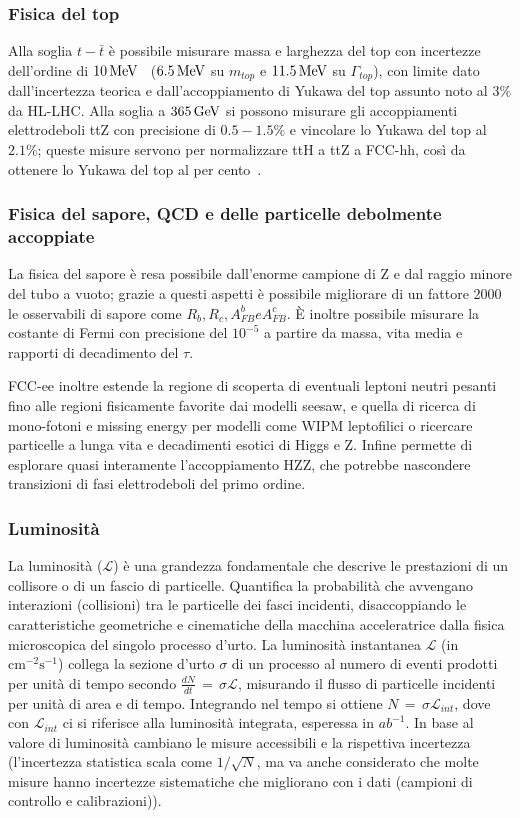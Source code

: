 \subsubsection{Fisica del top}
Alla soglia $t-\bar t$ è possibile misurare massa e larghezza del top con incertezze dell'ordine di $10\,\mathrm{MeV}$~\cite{FCC:FSR-v1} ($6.5\,\mathrm{MeV}$ su $m_{top}$ e $11.5\,\mathrm{MeV}$ su $\Gamma_{top}$), con limite dato dall'incertezza teorica e dall'accoppiamento di Yukawa del top assunto noto al $3\%$ da HL-LHC. Alla soglia a $365\,\mathrm{GeV}$ si possono misurare gli accoppiamenti elettrodeboli ttZ con precisione di $0.5-1.5\%$ e vincolare lo Yukawa del top al $2.1\%$; queste misure servono per normalizzare ttH a ttZ a FCC-hh, così da ottenere lo Yukawa del top al per cento~\cite{FCC:FSR-v1}.

\subsubsection{Fisica del sapore, QCD e delle particelle debolmente accoppiate}
La fisica del sapore è resa possibile dall'enorme campione di Z e dal raggio minore del tubo a vuoto; grazie a questi aspetti è possibile migliorare di un fattore 2000 le osservabili di sapore come $R_b, R_c, A_{FB}^b e A_{FB}^c$. È inoltre possibile misurare la costante di Fermi con precisione del $10^{-5}$ a partire da massa, vita media e rapporti di decadimento del $\tau$.

FCC-ee inoltre estende la regione di scoperta di eventuali leptoni neutri pesanti fino alle regioni fisicamente favorite dai modelli seesaw, e quella di ricerca di mono-fotoni e missing energy per modelli come WIPM leptofilici o ricercare particelle a lunga vita e decadimenti esotici di Higgs e Z. Infine permette di esplorare quasi interamente l'accoppiamento HZZ, che potrebbe nascondere transizioni di fasi elettrodeboli del primo ordine.

\subsubsection{Luminosità}
La luminosità ($\mathcal{L}$) è una grandezza fondamentale che descrive le prestazioni di un collisore o di un fascio di particelle. Quantifica la probabilità che avvengano interazioni (collisioni) tra le particelle dei fasci incidenti, disaccoppiando le caratteristiche geometriche e cinematiche della macchina acceleratrice dalla fisica microscopica del singolo processo d'urto. La luminosità instantanea $\mathcal{L}$ (in $\mathrm{cm}^{-2}\mathrm{s}^{-1}$) collega la sezione d'urto $\sigma$ di un processo al numero di eventi prodotti per unità di tempo secondo $\frac{dN}{dt}\,=\,\sigma\mathcal{L}$, misurando il flusso di particelle incidenti per unità di area e di tempo. Integrando nel tempo si ottiene $N\,=\,\sigma\mathcal{L}_{int}$, dove con $\mathcal{L}_{int}$ ci si riferisce alla luminosità integrata, esperessa in $ab^{-1}$. In base al valore di luminosità cambiano le misure accessibili e la rispettiva incertezza (l'incertezza statistica scala come $1/\sqrt{N}$, ma va anche considerato che molte misure hanno incertezze sistematiche che migliorano con i dati (campioni di controllo e calibrazioni)).

